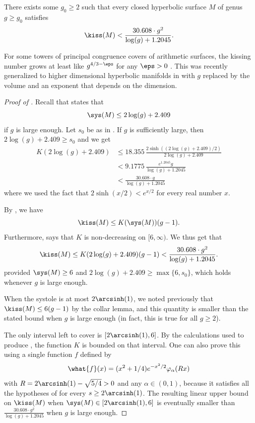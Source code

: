 \documentclass[12pt]{amsart}
\numberwithin{equation}{section}
\begin{document}
\begin{thm}  \label{thm:kiss_asymp}
There exists some $g_0 \geq 2$ such that every closed hyperbolic surface $M$ of genus $g\geq g_0$ satisfies 
\begin{align*}
\kiss(M) < \frac{30.608 \cdot g^2}{\log(g)+1.2045}.
\end{align*}
\end{thm}

\begin{rem}
For some towers of principal congruence covers of arithmetic surfaces, the kissing number grows at least like $g^{4/3 - \eps}$ for any $\eps>0$ \cite{Schmutz43}. This was recently generalized to higher dimensional hyperbolic manifolds in \cite{KissingHigher} with $g$ replaced by the volume and an exponent that depends on the dimension.
\end{rem}


\begin{proof}[Proof of ]
Recall that  states that \[\sys(M) \leq 2\log(g) + 2.409\]
if $g$ is large enough. Let $s_0$ be as in . If $g$ is sufficiently large, then $2\log(g) + 2.409 \geq s_0$ and we get
\begin{align*}
K(2\log(g) + 2.409) &\leq  18.355\, \frac{2\sinh((2\log(g) + 2.409)/2)}{2\log(g) + 2.409} \\
&< 9.1775\, \frac{e^{1.2045} g}{\log(g) + 1.2045} \\
&<  \frac{30.608 \cdot g}{\log(g) + 1.2045}
\end{align*}
where we used the fact that $2\sinh(x/2) < e^{x/2}$ for every real number $x$.



By , we have
\[
\kiss(M) \leq K(\sys(M)) (g-1).
\]
Furthermore,  says that $K$ is non-decreasing on $[6,\infty)$. We thus get that
\[
\kiss(M) \leq K(2\log(g) + 2.409) (g-1) < \frac{30.608 \cdot g^2}{\log(g) + 1.2045}.
\]
provided $\sys(M)\geq 6$ and $2\log(g) + 2.409 \geq \max\{ 6 , s_0 \}$, which holds whenever $g$ is large enough.


When the systole is at most $2\arcsinh(1)$, we noted previously that $\kiss(M)\leq 6(g-1)$ by the collar lemma, and this quantity is smaller than the stated bound when $g$ is large enough (in fact, this is true for all $g\geq 2$). 

The only interval left to cover is $[2\arcsinh(1),6]$. By the calculations used to produce , the function $K$ is bounded on that interval. One can also prove this using a single function $f$ defined by
\[
\what{f}(x) = (x^2+1/4)e^{-x^2/2} \varphi_\alpha(Rx)
\]
with $R = 2\arcsinh(1)-\sqrt{5/4}>0$ and any $\alpha\in(0,1)$, because it satisfies all the hypotheses of  for every $s \geq 2\arcsinh(1)$. The resulting linear upper bound on $\kiss(M)$ when $\sys(M) \in [2\arcsinh(1),6]$ is eventually smaller than $\frac{30.608 \cdot g^2}{\log(g)+1.2045}$ when $g$ is large enough.
\end{proof}
\end{document}
